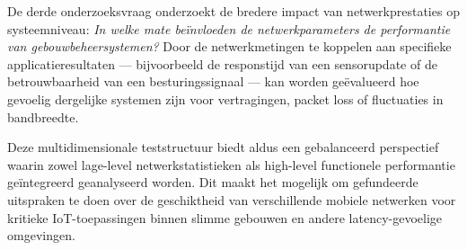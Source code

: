 De derde onderzoeksvraag onderzoekt de bredere impact van netwerkprestaties op systeemniveau: \textit{In welke mate beïnvloeden de netwerkparameters de performantie van gebouwbeheersystemen?} Door de netwerkmetingen te koppelen aan specifieke applicatieresultaten — bijvoorbeeld de responstijd van een sensorupdate of de betrouwbaarheid van een besturingssignaal — kan worden geëvalueerd hoe gevoelig dergelijke systemen zijn voor vertragingen, packet loss of fluctuaties in bandbreedte.

Deze multidimensionale teststructuur biedt aldus een gebalanceerd perspectief waarin zowel lage-level netwerkstatistieken als high-level functionele performantie geïntegreerd geanalyseerd worden. Dit maakt het mogelijk om gefundeerde uitspraken te doen over de geschiktheid van verschillende mobiele netwerken voor kritieke IoT-toepassingen binnen slimme gebouwen en andere latency-gevoelige omgevingen.

